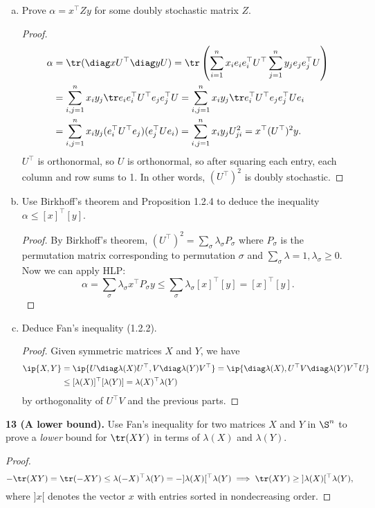 \documentclass[../borwein-lewis_notes.tex]{subfiles}
\begin{document}
\begin{enumerate}[(a)]
\item Prove $\alpha=x^\top Zy$ for some doubly stochastic matrix $Z$. 
\begin{proof}
\begin{align*}
\alpha &= \tr(\diag x U^\top\diag y U) = \tr\left(\sum_{i=1}^n x_ie_i
e_i^\top U^\top \sum_{j=1}^n y_je_je_j^\top U\right)\\
&= \sum_{i,j=1}^n x_iy_j\tr e_ie_i^\top U^\top e_je_j^\top U 
= \sum_{i,j=1}^n x_iy_j \tr e_i^\top U^\top e_j e_j^\top U e_i \\
&= \sum_{i,j=1}^n x_iy_j (e_i^\top U^\top e_j)( e_j^\top U e_i )
= \sum_{i,j=1}^n x_iy_j U_{ji}^2 = x^\top (U^\top)^2 y. 
\end{align*}
$U^\top$ is orthonormal, so $U$ is orthonormal, so after squaring each 
entry, each column and row sums to 1. In other words, $(U^\top)^2$ 
is doubly stochastic.
\end{proof}
\item Use Birkhoff's theorem and Proposition 1.2.4 to deduce the 
inequality $\alpha\leq[x]^\top[y]$.
\begin{proof}
By Birkhoff's theorem, $(U^\top)^2 = \sum_{\sigma}\lambda_{\sigma} P_{
\sigma}$ where $P_{\sigma}$ is the permutation matrix corresponding to 
permutation $\sigma$ and $\sum_\sigma \lambda = 1, \lambda_\sigma\geq 0$.
Now we can apply HLP:
\begin{equation*}
\alpha = \sum_\sigma \lambda_\sigma x^\top P_\sigma y \leq 
\sum_\sigma \lambda_\sigma [x]^\top [y] = [x]^\top [y].
\end{equation*}
\end{proof}
\item Deduce Fan's inequality (1.2.2).
\begin{proof}
Given symmetric matrices $X$ and $Y$, we have 
\begin{align*}
\ip{X,Y} &= \ip{U\diag\lambda(X)U^\top, V\diag\lambda(Y)V^\top}
= \ip{\diag\lambda(X), U^\top V\diag\lambda(Y) V^\top U}\\
&\leq [\lambda(X)]^\top[\lambda(Y)] = \lambda(X)^\top\lambda(Y)
\end{align*}
by orthogonality of $U^\top V$ and the previous parts.
\end{proof}
\end{enumerate}
\noindent \textbf{13 (A lower bound).} Use Fan's inequality for two 
matrices $X$ and $Y$ in $\S^n$ to prove a \textit{lower} bound for 
$\tr(XY)$ in terms of $\lambda(X)$ and $\lambda(Y)$.
\begin{proof}
\begin{equation*}
-\tr(XY)=\tr(-XY) \leq \lambda(-X)^\top\lambda(Y) = -]\lambda(X)[^\top
\lambda(Y) 
\implies \tr(XY) \geq\; ]\lambda(X)[^\top\lambda(Y),
\end{equation*}
where $]x[$ denotes the vector $x$ with entries sorted in nondecreasing 
order.
\end{proof}
\end{document}
